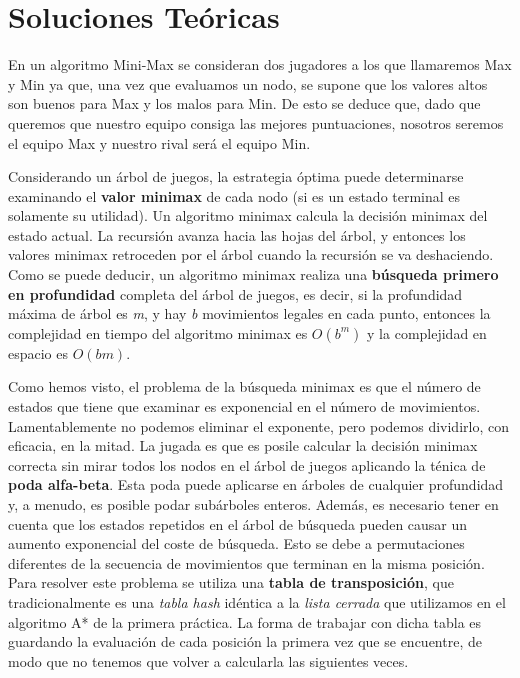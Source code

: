 \chapter {Soluciones Teóricas}
En un algoritmo Mini-Max se consideran dos jugadores a los que
llamaremos Max y Min ya que, una vez que evaluamos un nodo, se supone
que los valores altos son buenos para Max y los malos para Min. De
esto se deduce que, dado que queremos que nuestro equipo consiga las
mejores puntuaciones, nosotros seremos el equipo Max y nuestro rival
será el equipo Min.

Considerando un árbol de juegos, la estrategia óptima puede
determinarse examinando el \textbf{valor minimax} de cada nodo (si es un estado
terminal es solamente su utilidad). Un algoritmo minimax calcula la
decisión minimax del estado actual. La recursión avanza hacia las
hojas del árbol, y entonces los valores minimax retroceden por el
árbol cuando la recursión se va deshaciendo. Como se puede deducir, un
algoritmo minimax realiza una \textbf{búsqueda primero en profundidad}
completa del árbol de juegos, es decir, si la profundidad máxima de
árbol es \emph{m}, y hay \emph{b} movimientos legales en cada punto,
entonces la complejidad en tiempo del algoritmo minimax es $O(b^m)$ y
la complejidad en espacio es $O(bm)$.

Como hemos visto, el problema de la búsqueda minimax es que el número
de estados que tiene que examinar es exponencial en el número de
movimientos. Lamentablemente no podemos eliminar el exponente, pero
podemos dividirlo, con eficacia, en la mitad. La jugada es que es
posile calcular la decisión minimax correcta sin mirar todos los nodos
en el árbol de juegos aplicando la ténica de \textbf{poda alfa-beta}. Esta poda
puede aplicarse en árboles de cualquier profundidad y, a menudo, es
posible podar subárboles enteros. Además, es necesario tener en cuenta
que los estados repetidos en el árbol de búsqueda pueden causar un
aumento exponencial del coste de búsqueda. Esto se debe a
permutaciones diferentes de la secuencia de movimientos que terminan
en la misma posición. Para resolver este problema se utiliza una \textbf{tabla
de transposición}, que tradicionalmente es una \emph{tabla hash} idéntica a la
\emph{lista cerrada} que utilizamos en el algoritmo A* de la primera
práctica. La forma de trabajar con dicha tabla es guardando la
evaluación de cada posición la primera vez que se encuentre, de modo
que no tenemos que volver a calcularla las siguientes veces.

